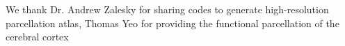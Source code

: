 We thank Dr. Andrew Zalesky for sharing codes to generate high-resolution 
parcellation atlas, Thomas Yeo for providing the functional parcellation of 
the cerebral cortex
